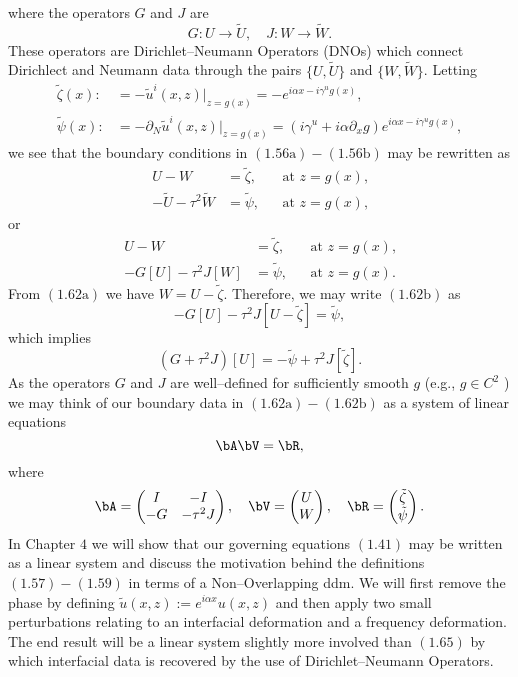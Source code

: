 where the operators $G$ and $J$ are
\begin{equation}G: U \to \tilde{U},\quad J: W \to \tilde{W}.\end{equation}
These operators are Dirichlet--Neumann Operators (DNOs) which connect Dirichlect and Neumann data through the pairs $\{U,\tilde{U}\}$ and $\{W,\tilde{W}\}$. Letting 
\begin{align}
\tilde{\zeta}(x):&=-\tilde{u}^{i}(x,z)|_{z=g(x)}=-e^{i\alpha x-i\gamma^u g(x)}, \\
\tilde{\psi}(x):&=-\partial_N \tilde{u}^{i}(x,z)|_{z=g(x)}=\left(i\gamma^u+i\alpha \partial_x g\right)e^{i\alpha x-i\gamma^u g(x)},
\end{align}
we see that the boundary conditions in $(1.56\text{a})-(1.56\text{b})$ may be rewritten as
\begin{align*}
U-W&=\tilde{\zeta}, &&\text{at $z=g(x)$,}\\
-\tilde{U}-\tau^2\tilde{W}&=\tilde{\psi}, &&\text{at $z=g(x)$,}
\end{align*}
or
\begin{subequations} 
\begin{align}
U-W&=\tilde{\zeta}, &&\text{at $z=g(x)$,}\\
-G[U]-\tau^2J[W]&=\tilde{\psi}, &&\text{at $z=g(x)$.} 
\end{align}
\end{subequations}
From $(1.62\text{a})$ we have $W=U-\tilde{\zeta}$. Therefore, we may write $(1.62\text{b})$ as
$$-G[U]-\tau^2J\left[U-\tilde{\zeta}\right]=\tilde{\psi},$$
which implies
\begin{equation}(G+\tau^2J)[U]=-\tilde{\psi}+\tau^2J\left[\tilde{\zeta}\right].\end{equation}
As the operators $G$ and $J$ are well--defined for sufficiently smooth $g$ (e.g., $g\in C^2$ \cite{NichollsReitich03b}) we may think of our boundary data in $(1.62\text{a})- (1.62\text{b})$ as a system of linear equations
\begin{equation}
    \bA\bV=\bR,
\end{equation}
where
\begin{equation}
 \bA=\begin{pmatrix}I & -I\\-G & -\tau^2J\end{pmatrix},\quad 
 \bV=\begin{pmatrix}U \\ W\end{pmatrix},\quad
 \bR=\begin{pmatrix}\tilde{\zeta} \\ \tilde{\psi}\end{pmatrix}.
\end{equation}
In Chapter $4$ we will show that our governing equations $(1.41)$ may be written as a linear system and discuss the motivation behind the definitions $(1.57)-(1.59)$ in terms of a Non--Overlapping \gls{ddm}. We will first remove the phase by defining $\tilde{u}(x,z):=e^{i\alpha x}u(x,z)$ and then apply two small perturbations relating to an interfacial deformation and a frequency deformation. The end result will be a linear system slightly more involved than $(1.65)$ by which interfacial data is recovered by the use of Dirichlet--Neumann Operators.
